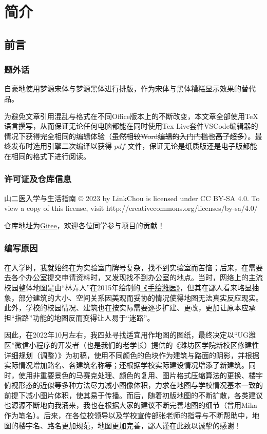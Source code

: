 \chapter[简介]{简介\vspace{-1.5em}}

\section[前言]{前言\vspace{-.5em}}
\subsection[题外话]{题外话}
自豪地使用梦源宋体与梦源黑体进行排版，作为宋体与黑体糟糕显示效果的替代品。

为避免文章引用混乱与格式在不同Office版本上的不断改变，本文章全部使用\TeX 语言撰写，从而保证无论任何电脑都能在同时使用Tex Live套件VSCode编辑器\footnotemark 的情况下获得完全相同的编辑体验（\sout{虽然相较Word编辑的入门门槛也高了超多}）。最终发布时选用\XeLaTeX 引擎二次编译以获得 $pdf$ 文件，保证无论是纸质版还是电子版都能在相同的格式下进行阅读。

\subsection[许可证及仓库信息]{许可证及仓库信息}
山二医入学与生活指南 © 2023 by LinkChou is licensed under CC BY-SA 4.0. To view a copy of this license, visit http://creativecommons.org/licenses/by-sa/4.0/

仓库地址为\uline{\href{https://gitee.com/mikazo/guide_for_freshman}{Gitee}}，欢迎各位同学参与项目的贡献！

\subsection[编写原因]{编写原因}
在入学时，我就始终在为实验室门牌号复杂，找不到实验室而苦恼；后来，在需要去各个办公室提交申请资料时，又发现找不到办公室的地点。当时，网络上的主流校园整体地图是由“林弄人”在2015年绘制的\uline{\href{https://www.zcool.com.cn/work/ZMTgxMDQwMjg=.html?}{《手绘潍医》}}，但其在鄙人看来略显抽象，部分建筑的大小、空间关系因美观而妥协的情况使得地图无法真实反应现实。此外，学校的校园情况、建筑也在按实际需要逐步扩建、更改，更加让原本应承担“指路”功能的地图反而变得让人易于“迷路”。

因此，在2022年10月左右，我四处寻找适宜用作地图的图纸，最终决定以“UG潍医”微信小程序的开发者（也是我们的老学长）提供的《潍坊医学院新校区修建性详细规划（调整）》为初稿，使用不同颜色的色块作为建筑与路面的阴影，并根据实际情况增加路名、各建筑名称等；还根据学校实际建设情况增添了新建筑。同时，使用非重要景色的马赛克处理、颜色的复用、图片格式压缩算法的更换、楼宇俯视形态的近似等多种方法尽力减小图像体积，力求在地图与学校情况基本一致的前提下减小图片体积，使其易于传播。而后，随着初版地图的不断扩散，各类建议也源源不断地向我涌来，我也在根据大家的建议不断完善地图的细节（曾用Mika作为笔名）。后来，在各位校领导以及学校宣传部张老师的指导与不断帮助中，地图的楼宇名、路名更加规范，地图更加完善，鄙人谨在此致以诚挚的感谢！

